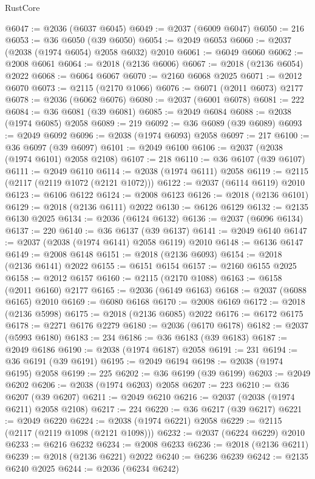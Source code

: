 \begin{lexlean}{RustCore}
\begin{coremodule}
@6047 := @2036 (@6037 @6045)
@6049 := @2037 (@6009 @6047)
@6050 := 216
@6053 := @36 @6050 (@39 @6050)
@6054 := @2049 @6053
@6060 := @2037 (@2038 (@1974 @6054) @2058 @6032) @2010
@6061 := @6049 @6060
@6062 := @2008 @6061
@6064 := @2018 (@2136 @6006)
@6067 := @2018 (@2136 @6054) @2022
@6068 := @6064 @6067
@6070 := @2160 @6068 @2025
@6071 := @2012 @6070
@6073 := @2115 (@2170 @1066)
@6076 := @6071 (@2011 @6073) @2177
@6078 := @2036 (@6062 @6076)
@6080 := @2037 (@6001 @6078)
@6081 := 222
@6084 := @36 @6081 (@39 @6081)
@6085 := @2049 @6084
@6088 := @2038 (@1974 @6085) @2058
@6089 := 219
@6092 := @36 @6089 (@39 @6089)
@6093 := @2049 @6092
@6096 := @2038 (@1974 @6093) @2058
@6097 := 217
@6100 := @36 @6097 (@39 @6097)
@6101 := @2049 @6100
@6106 := @2037 (@2038 (@1974 @6101) @2058 @2108)
@6107 := 218
@6110 := @36 @6107 (@39 @6107)
@6111 := @2049 @6110
@6114 := @2038 (@1974 @6111) @2058
@6119 := @2115 (@2117 (@2119 @1072 (@2121 @1072)))
@6122 := @2037 (@6114 @6119) @2010
@6123 := @6106 @6122
@6124 := @2008 @6123
@6126 := @2018 (@2136 @6101)
@6129 := @2018 (@2136 @6111) @2022
@6130 := @6126 @6129
@6132 := @2135 @6130 @2025
@6134 := @2036 (@6124 @6132)
@6136 := @2037 (@6096 @6134)
@6137 := 220
@6140 := @36 @6137 (@39 @6137)
@6141 := @2049 @6140
@6147 := @2037 (@2038 (@1974 @6141) @2058 @6119) @2010
@6148 := @6136 @6147
@6149 := @2008 @6148
@6151 := @2018 (@2136 @6093)
@6154 := @2018 (@2136 @6141) @2022
@6155 := @6151 @6154
@6157 := @2160 @6155 @2025
@6158 := @2012 @6157
@6160 := @2115 (@2170 @1088)
@6163 := @6158 (@2011 @6160) @2177
@6165 := @2036 (@6149 @6163)
@6168 := @2037 (@6088 @6165) @2010
@6169 := @6080 @6168
@6170 := @2008 @6169
@6172 := @2018 (@2136 @5998)
@6175 := @2018 (@2136 @6085) @2022
@6176 := @6172 @6175
@6178 := @2271 @6176 @2279
@6180 := @2036 (@6170 @6178)
@6182 := @2037 (@5993 @6180)
@6183 := 234
@6186 := @36 @6183 (@39 @6183)
@6187 := @2049 @6186
@6190 := @2038 (@1974 @6187) @2058
@6191 := 231
@6194 := @36 @6191 (@39 @6191)
@6195 := @2049 @6194
@6198 := @2038 (@1974 @6195) @2058
@6199 := 225
@6202 := @36 @6199 (@39 @6199)
@6203 := @2049 @6202
@6206 := @2038 (@1974 @6203) @2058
@6207 := 223
@6210 := @36 @6207 (@39 @6207)
@6211 := @2049 @6210
@6216 := @2037 (@2038 (@1974 @6211) @2058 @2108)
@6217 := 224
@6220 := @36 @6217 (@39 @6217)
@6221 := @2049 @6220
@6224 := @2038 (@1974 @6221) @2058
@6229 := @2115 (@2117 (@2119 @1098 (@2121 @1098)))
@6232 := @2037 (@6224 @6229) @2010
@6233 := @6216 @6232
@6234 := @2008 @6233
@6236 := @2018 (@2136 @6211)
@6239 := @2018 (@2136 @6221) @2022
@6240 := @6236 @6239
@6242 := @2135 @6240 @2025
@6244 := @2036 (@6234 @6242)

\end{coremodule}
\end{lexlean}
